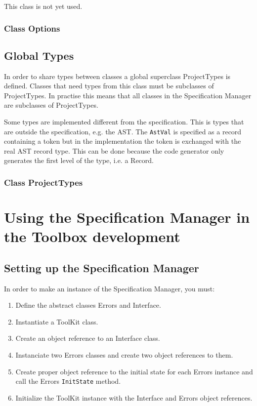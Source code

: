 \documentclass[11pt]{article}
\newcommand{\specman} {Specification Manager}
\begin{document}
This class is not yet used. 

\subsubsection{Class Options}





\subsection{Global Types}

In order to share types between classes a global superclass
ProjectTypes is defined. Classes that need types from this class must
be subclasses of ProjectTypes. In practise this means that all classes
in the \specman{} are subclasses of ProjectTypes. 

Some types are implemented different from the specification. This is
types that are outside the specification, e.g. the AST. The
\texttt{AstVal} is specified as a record containing a token but in the
implementation the token is exchanged with the real AST record type.
This can be done because the code generator only generates the first
level of the type, i.e. a Record.

\subsubsection{Class ProjectTypes}


\section{Using the Specification Manager in the Toolbox development}
\label{sec:using}

\subsection{Setting up the Specification Manager}
\label{sec:setup}

In order to make an instance of the Specification Manager, you must:
\begin{enumerate}
\item Define the abstract classes Errors and Interface.
\item Instantiate a ToolKit class.
\item Create an object reference to an Interface class.
\item Instanciate two Errors classes and create two object references
  to them.
\item Create proper object reference to the initial state for each
  Errors instance and call the Errors \texttt{InitState} method.
\item Initialize the ToolKit instance with the Interface and Errors
  object references.
\end{enumerate}
\end{document}
